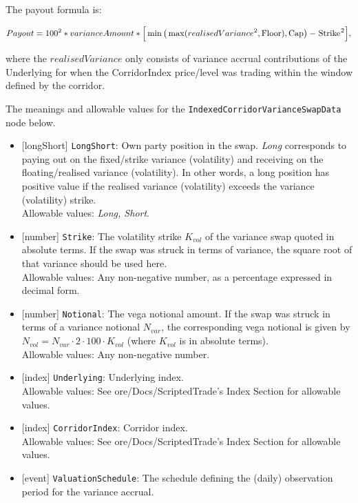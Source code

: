 The payout formula is:

\begin{equation*}
  Payout = 100^2 * varianceAmount * \Big[ \min \big( \max (realisedVariance^2, \text{\lstinline!Floor!}), \text{\lstinline!Cap!}\big) - \text{\lstinline!Strike!}^2 \Big],
\end{equation*}

where the $realisedVariance$ only consists of variance accrual contributions of the Underlying for when the CorridorIndex price/level
was trading within the window defined by the corridor.

The meanings and allowable values for the \lstinline!IndexedCorridorVarianceSwapData! node below.

\begin{itemize}
  \item{}[longShort] \lstinline!LongShort!: Own party position in the swap. \emph{Long} corresponds to paying out on the
  fixed/strike variance (volatility) and receiving on the floating/realised variance (volatility). In other words,
  a long position has positive value if the realised variance (volatility) exceeds the variance (volatility)
  strike. \\
  Allowable values: \emph{Long, Short}.
  \item{}[number] \lstinline!Strike!: The volatility strike $K_{vol}$ of the variance swap quoted in absolute terms.
  If the swap was struck in terms of variance, the square root of that variance should be used here. \\
  Allowable values: Any non-negative number, as a percentage expressed in decimal form.
  \item{}[number] \lstinline!Notional!: The vega notional amount. If the swap was struck in terms of a variance notional
  $N_{var}$, the corresponding vega notional is given by $N_{vol} = N_{var} \cdot 2 \cdot 100 \cdot K_{vol}$ (where
  $K_{vol}$ is in absolute terms). \\
  Allowable values: Any non-negative number.
  \item{}[index] \lstinline!Underlying!: Underlying index. \\
  Allowable values: See ore/Docs/ScriptedTrade's Index Section for allowable values.
    \item{}[index] \lstinline!CorridorIndex!: Corridor index. \\
  Allowable values: See ore/Docs/ScriptedTrade's Index Section for allowable values.
  \item{}[event] \lstinline!ValuationSchedule!: The schedule defining the (daily) observation period for the variance accrual. \\

\end{itemize}
